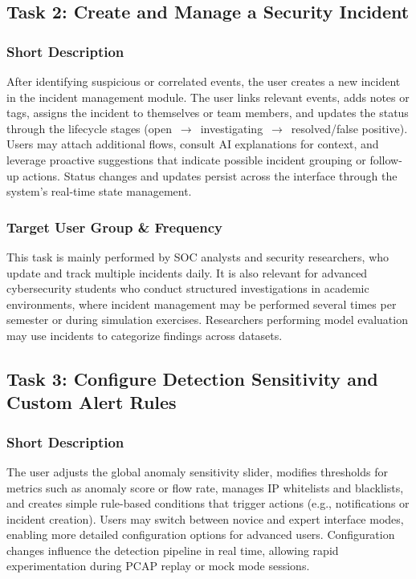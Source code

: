 \documentclass[
    11pt, 
    a4paper, 
    parskip=half, 
    headsepline,       %
    DIV=12             %
]{scrartcl}
\begin{document}
\subsection{Task 2: Create and Manage a Security Incident}

\subsubsection*{Short Description}
After identifying suspicious or correlated events, the user creates a new incident in the incident management module. The user links relevant events, adds notes or tags, assigns the incident to themselves or team members, and updates the status through the lifecycle stages (open~$\rightarrow$~investigating~$\rightarrow$~resolved/false positive). Users may attach additional flows, consult AI explanations for context, and leverage proactive suggestions that indicate possible incident grouping or follow-up actions. Status changes and updates persist across the interface through the system’s real-time state management.

\subsubsection*{Target User Group \& Frequency}
This task is mainly performed by SOC analysts and security researchers, who update and track multiple incidents daily. It is also relevant for advanced cybersecurity students who conduct structured investigations in academic environments, where incident management may be performed several times per semester or during simulation exercises. Researchers performing model evaluation may use incidents to categorize findings across datasets.

\subsection{Task 3: Configure Detection Sensitivity and Custom Alert Rules}

\subsubsection*{Short Description}
The user adjusts the global anomaly sensitivity slider, modifies thresholds for metrics such as anomaly score or flow rate, manages IP whitelists and blacklists, and creates simple rule-based conditions that trigger actions (e.g., notifications or incident creation). Users may switch between novice and expert interface modes, enabling more detailed configuration options for advanced users. Configuration changes influence the detection pipeline in real time, allowing rapid experimentation during PCAP replay or mock mode sessions.
\end{document}
